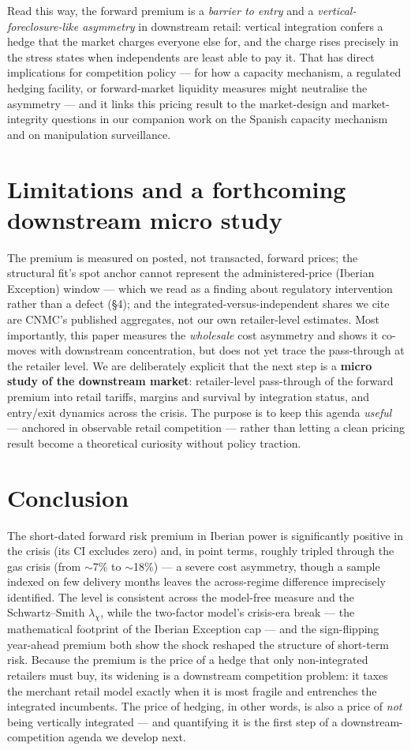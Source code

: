\documentclass[11pt,a4paper]{article}
\begin{document}
Read this way, the forward premium is a \emph{barrier to entry} and a
\emph{vertical-foreclosure-like asymmetry} in downstream retail: vertical
integration confers a hedge that the market charges everyone else for, and the
charge rises precisely in the stress states when independents are least able to pay
it. That has direct implications for competition policy --- for how a capacity
mechanism, a regulated hedging facility, or forward-market liquidity measures might
neutralise the asymmetry --- and it links this pricing result to the
market-design and market-integrity questions in our companion work on the Spanish
capacity mechanism and on manipulation surveillance.

\section{Limitations and a forthcoming downstream micro study}

The premium is measured on posted, not transacted, forward prices; the structural
fit's spot anchor cannot represent the administered-price (Iberian Exception) window
--- which we read as a finding about regulatory intervention rather than a defect
(\S4); and the integrated-versus-independent shares we cite are CNMC's published
aggregates, not our own retailer-level estimates. Most importantly, this paper measures the
\emph{wholesale} cost asymmetry and shows it co-moves with downstream concentration,
but does not yet trace the pass-through at the retailer level. We are deliberately explicit that the next step is a \textbf{micro study
of the downstream market}: retailer-level pass-through of the forward premium into
retail tariffs, margins and survival by integration status, and entry/exit
dynamics across the crisis. The purpose is to keep this agenda \emph{useful} ---
anchored in observable retail competition --- rather than letting a clean pricing
result become a theoretical curiosity without policy traction.

\section{Conclusion}

The short-dated forward risk premium in Iberian power is significantly positive in
the crisis (its CI excludes zero) and, in point terms, roughly tripled through the
gas crisis (from $\sim$7\% to $\sim$18\%) --- a severe cost asymmetry, though a
sample indexed on few delivery months leaves the across-regime difference imprecisely
identified. The level is consistent across the model-free measure and the
Schwartz--Smith $\lambda_\chi$, while the two-factor model's crisis-era break ---
the mathematical footprint of the Iberian Exception cap --- and the sign-flipping
year-ahead premium both show the shock reshaped the structure of short-term risk. Because the premium is the price of a hedge that only
non-integrated retailers must buy, its widening is a downstream competition
problem: it taxes the merchant retail model exactly when it is most fragile and
entrenches the integrated incumbents. The price of hedging, in other words, is also
a price of \emph{not} being vertically integrated --- and quantifying it is the
first step of a downstream-competition agenda we develop next.


\end{document}
